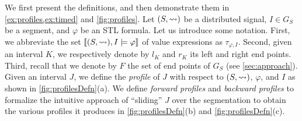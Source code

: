 We first present the definitions, and then demonstrate them in \cref{ex:profiles,ex:timed} and \cref{fig:profiles}. 
Let $(S,{\rightsquigarrow})$ be a distributed signal, $I \in G_S$ be a segment, and $\varphi$ be an STL formula.
Let us introduce some notation.
First, we abbreviate the set $\llbracket (S,{\rightsquigarrow}), I \models \varphi \rrbracket$ of value expressions as $\tau_{\varphi,I}$.
Second, given an interval $K$, we respectively denote by $l_K$ and $r_K$ its left and right end points.
Third, recall that we denote by $F$ the set of end points of $G_S$ (see \cref{sec:approach}).
Given an interval $J$, we define the \emph{profile} of $J$ with respect to $(S,{\rightsquigarrow})$, $\varphi$, and 
$I$ as shown in \cref{fig:profilesDefn}(a).
We define \emph{forward profiles} and \emph{backward profiles} to formalize the intuitive approach of ``sliding'' $J$ over the segmentation to obtain the various profiles it produces in \cref{fig:profilesDefn}(b) and \cref{fig:profilesDefn}(c).

